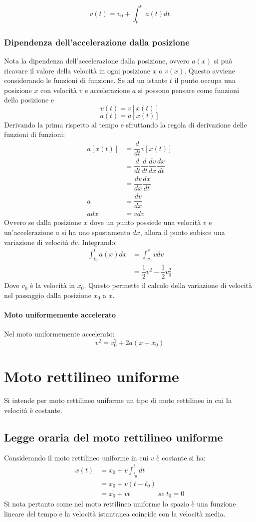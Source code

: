 \documentclass[class=book, crop=false, oneside, 12pt]{standalone}
\begin{document}
		\begin{equation}
			v(t) = v_0 + \int_{t_0}^t a(t)dt
		\end{equation}

		\subsubsection{Dipendenza dell'accelerazione dalla posizione}
		Nota la dipendenza dell'accelerazione dalla posizione, ovvero $a(x)$ si pu\`o ricavare il valore della velocit\`a in ogni posizione $x$ o $v(x)$.
		Questo avviene considerando le funzioni di funzione.
		Se ad un istante $t$ il punto occupa una posizione $x$ con velocit\`a $v$ e accelerazione $a$ si possono pensare come funzioni della posizione e
		$$v(t) = v[x(t)]$$
		$$a(t) = a[x(t)]$$
		Derivando la prima rispetto al tempo e sfruttando la regola di derivazione delle funzioni di funzioni:
		\begin{align*}
			a[x(t)] &= \dfrac{d}{dt}v[x(t)]\\
			        &= \dfrac{d}{dt}\dfrac{d}{dt}\dfrac{dv}{dx}\dfrac{dx}{dt}\\
		      		&= \dfrac{dv}{dx}\dfrac{dx}{dt}\\
			a  	    &= \dfrac{dv}{dx}\\
			adx     &= vdv
		\end{align*}
		Ovvero se dalla posizione $x$ dove un punto possiede una velocit\`a $v$ e un'accelerazione $a$ si ha uno spostamento $dx$, allora il punto subisce una variazione di velocit\`a $dv$.
		Integrando:
		\begin{align*}
			\int_{t_0}^t a(x)dx &= \int_{v_0}^{v} vdv\\
		      		       &= \dfrac{1}{2}v^2 -\dfrac{1}{2}v_0^2
		\end{align*}
		Dove $v_0$ \`e la velocit\`a in $x_0$.
		Questo permette il calcolo della variazione di velocit\`a nel passaggio dalla posizione $x_0$ a $x$.
			\paragraph{Moto uniformemente accelerato}
			Nel moto uniformemente accelerato:
			$$v^2 = v_0^2 + 2a(x-x_0)$$
\section{Moto rettilineo uniforme}
Si intende per moto rettilineo uniforme un tipo di moto rettilineo in cui la velocit\`a \`e costante.
  \subsection{Legge oraria del moto rettilineo uniforme}
	Considerando il moto rettilineo uniforme in cui $v$ \`e costante si ha:
	\begin{align*}
		x(t) &= x_0 + v\int_{t_0}^t dt\\
		     &=x_0 + v(t-t_0)\\
		     &=x_0 + vt\qquad\qquad se\ t_0 = 0
	\end{align*}
	Si nota pertanto come nel moto rettilineo uniforme lo spazio \`e una funzione lineare del tempo e la velocit\`a istantanea coincide con la velocit\`a media.
\end{document}
